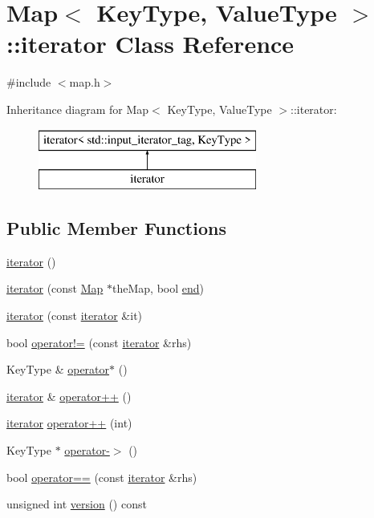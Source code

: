\hypertarget{classMap_1_1iterator}{}\section{Map$<$ Key\+Type, Value\+Type $>$\+:\+:iterator Class Reference}
\label{classMap_1_1iterator}


{\ttfamily \#include $<$map.\+h$>$}

Inheritance diagram for Map$<$ Key\+Type, Value\+Type $>$\+:\+:iterator\+:\begin{figure}[H]
\begin{center}
\leavevmode
\includegraphics[height=2.000000cm]{classMap_1_1iterator}
\end{center}
\end{figure}
\subsection*{Public Member Functions}
\begin{DoxyCompactItemize}
\item 
\mbox{\hyperlink{classMap_1_1iterator_a67d652c2433cf9217ed2a1485092fdd1}{iterator}} ()
\item 
\mbox{\hyperlink{classMap_1_1iterator_a963233ec2eced24db44f8d6296317091}{iterator}} (const \mbox{\hyperlink{classMap}{Map}} $\ast$the\+Map, bool \mbox{\hyperlink{classMap_a68b688a51bd0cf6fb5bc2cba292209a8}{end}})
\item 
\mbox{\hyperlink{classMap_1_1iterator_a698b7553261e7209d6c29fb55627dce4}{iterator}} (const \mbox{\hyperlink{classMap_1_1iterator}{iterator}} \&it)
\item 
bool \mbox{\hyperlink{classMap_1_1iterator_ae1983f2cb0df1f0cbe77ac29590e2e2b}{operator!=}} (const \mbox{\hyperlink{classMap_1_1iterator}{iterator}} \&rhs)
\item 
Key\+Type \& \mbox{\hyperlink{classMap_1_1iterator_a26107e2ced3252ee2bf81dd666739da7}{operator$\ast$}} ()
\item 
\mbox{\hyperlink{classMap_1_1iterator}{iterator}} \& \mbox{\hyperlink{classMap_1_1iterator_af1b1c7856a59f34c7d3570f946a2ff00}{operator++}} ()
\item 
\mbox{\hyperlink{classMap_1_1iterator}{iterator}} \mbox{\hyperlink{classMap_1_1iterator_a538d230f8b52d2bc0950e26ce74ec239}{operator++}} (int)
\item 
Key\+Type $\ast$ \mbox{\hyperlink{classMap_1_1iterator_a917c74872cce637554f68ebe3c666785}{operator-\/$>$}} ()
\item 
bool \mbox{\hyperlink{classMap_1_1iterator_a798956e7a65ef16c891d129b3ced0f9e}{operator==}} (const \mbox{\hyperlink{classMap_1_1iterator}{iterator}} \&rhs)
\item 
unsigned int \mbox{\hyperlink{classMap_1_1iterator_a0aa696ccb72cbf928535d6b646bac1aa}{version}} () const
\end{DoxyCompactItemize}


